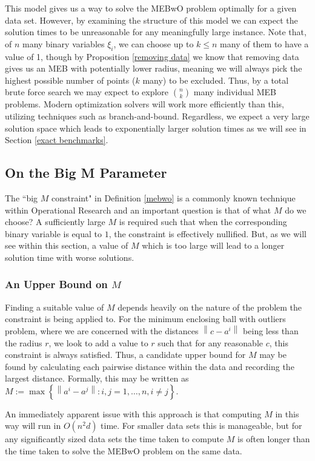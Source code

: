\documentclass[11pt,twoside]{report}
\newcommand{\norm}[1]{\left\lVert#1\right\rVert} %
\theoremstyle{definition}
\numberwithin{theorem}{section}
\numberwithin{definition}{section}
\numberwithin{lemma}{section}
\numberwithin{proposition}{section}
\numberwithin{equation}{section}
\numberwithin{figure}{section}
\begin{document}
This model gives us a way to solve the MEBwO problem optimally for a given data set. However, by examining the structure of this model we can expect the solution times to be unreasonable for any meaningfully large instance. Note that, of $n$ many binary variables $\xi_i$, we can choose up to $k\leq n$ many of them to have a value of 1, though by Proposition \ref{removing data} we know that removing data gives us an MEB with potentially lower radius, meaning we will always pick the highest possible number of points ($k$ many) to be excluded. Thus, by a total brute force search we may expect to explore $\binom{n}{k}$ many individual MEB problems. Modern optimization solvers will work more efficiently than this, utilizing techniques such as branch-and-bound. Regardless, we expect a very large solution space which leads to exponentially larger solution times as we will see in Section \ref{exact benchmarks}.


\subsection{On the Big M Parameter}\label{sec:M}
The ``big $M$ constraint" in Definition \ref{mebwo} is a commonly known technique within Operational Research and an important question is that of what $M$ do we choose? A sufficiently large $M$ is required such that when the corresponding binary variable is equal to $1$, the constraint is effectively nullified. But, as we will see within this section, a value of $M$ which is too large will lead to a longer solution time with worse solutions.

\subsubsection{An Upper Bound on $M$}
Finding a suitable value of $M$ depends heavily on the nature of the problem the constraint is being applied to. For the minimum enclosing ball with outliers problem, where we are concerned with the distances $\norm{c-a^i}$ being less than the radius $r$, we look to add a value to $r$ such that for any reasonable $c$, this constraint is always satisfied. Thus, a candidate upper bound for $M$ may be found by calculating each pairwise distance within the data and recording the largest distance. Formally, this may be written as $M:= \max\left\{\norm{a^i-a^j}: i,j = 1,\ldots,n, i\neq j\right\}$.

An immediately apparent issue with this approach is that computing $M$ in this way will run in $O(n^2d)$ time. For smaller data sets this is manageable, but for any significantly sized data sets the time taken to compute $M$ is often longer than the time taken to solve the MEBwO problem on the same data.
\end{document}
